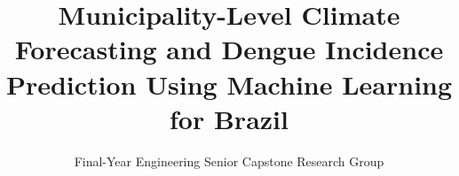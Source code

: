 \documentclass[journal,onecolumn,11pt]{IEEEtran}
\begin{document}
\title{Municipality-Level Climate Forecasting and Dengue Incidence Prediction Using Machine Learning for Brazil}

\author{Final-Year Engineering Senior Capstone Research Group\\
}

\maketitle

\end{document}
